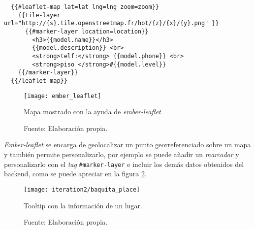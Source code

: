 \begin{verbatim}
  {{#leaflet-map lat=lat lng=lng zoom=zoom}}
    {{tile-layer url="http://{s}.tile.openstreetmap.fr/hot/{z}/{x}/{y}.png" }}
      {{#marker-layer location=location}}
        <h3>{{model.name}}</h3>
        {{model.description}} <br>
        <strong>telf:</strong> {{model.phone}} <br>
        <strong>piso </strong>#{{model.level}}
    {{/marker-layer}}
  {{/leaflet-map}}
\end{verbatim}


\begin{figure}[H]
      \begin{center}
        \texttt{[image: ember\_leaflet]}

        \caption{ Mapa mostrado con la ayuda de \emph{ember-leaflet}}
        \label{fig:ember_leaflet}
        \caption*{Fuente: Elaboración propia.}
      \end{center}
\end{figure}

\emph{Ember-leaflet} se encarga de geolocalizar un punto georreferenciado sobre un mapa y también permite personalizarlo, por ejemplo se puede añadir un \emph{marcador}  y personalizarlo con el \emph{tag} \verb|#marker-layer| e incluir los demás datos obtenidos del backend, como se puede apreciar en la figura \ref{fig:baquita_place}.


\begin{figure}[H]
  \begin{center}
    \texttt{[image: iteration2/baquita\_place]}
    \caption{Tooltip con la información de un lugar.}
    \label{fig:baquita_place}
    \caption*{Fuente: Elaboración propia.}
  \end{center}
\end{figure}









